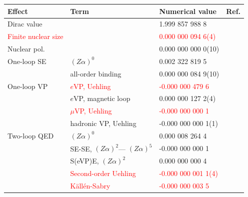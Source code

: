 %
%
\begin{table}
\setlength\extrarowheight{7pt}
\centering
\begin{footnotesize}
\begin{tabular}{llll}
Effect                  & Term                  & Numerical value                 & Ref. \\
\hline
Dirac value             &                       & \phantom{-}1.999 857 988 8      & \cite{breit1928,CODATA2014} \\
\textcolor{red}{Finite nuclear size}     &                       & \textcolor{red}{\phantom{-}0.000 000 094 6(4)}   & \cite{Angeli2013} \\
Nuclear pol.    &                       & \phantom{-}0.000 000 000 0(10)  &  \\
One-loop SE             & $(Z \alpha)^0$        & \phantom{-}0.002 322 819 5      & \cite{Schwinger48,CODATA2014} \\
                        & all-order binding     & \phantom{-}0.000 000 084 9(10)  & \\
One-loop VP             & \textcolor{red}{$e$VP, Uehling}        & \textcolor{red}{-0.000 000 479 6}                & \cite{Karshenboim2001} \\
                        & $e$VP, magnetic loop  & \phantom{-}0.000 000 127 2(4)   & \\
                        & \textcolor{red}{$\mu$VP, Uehling}      &           \textcolor{red}{-0.000 000 000 1}      & \cite{Karshenboim2001}\\
                        & hadronic VP, Uehling  &           -0.000 000 000 1(1)   & \\
Two-loop QED            &  $(Z \alpha)^0$       & \phantom{-}0.000 008 264 4      &  \cite{Peterman57,Sommerfield58} \\
                        & SE-SE, $(Z \alpha)^2$--- $(Z \alpha)^5$ & -0.000 000 000 1& \cite{Eides1997,Czarnecki2000,Pachucki2005,czarnecki2018}\\
                        & S(eVP)E, $(Z \alpha)^2$                 & \phantom{-}0.000 000 000 4& \cite{Peterman57,Sommerfield58,Eides1997,Czarnecki2000}\\
                        & \textcolor{red}{Second-order Uehling}  & \textcolor{red}{-0.000 000 001 1(4)}             & \\
                        & \textcolor{red}{K\"all\'en-Sabry}      & \textcolor{red}{-0.000 000 003 5}                & \\

\end{tabular}
\end{footnotesize}
\end{table}
